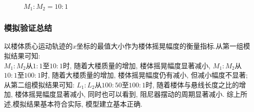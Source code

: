 \documentclass[10.5pt,a4paper]{ctexart}
\begin{document}
\begin{figure}[htbp] \centering    
      \\
  \caption{$M_1 : M_2 = 10 : 1$}     
  \label{fig:2}     
\end{figure}
\subsubsection*{模拟验证总结}
以楼体质心运动轨迹的$x$坐标的最值大小作为楼体摇晃幅度的衡量指标.从第一组模拟结果可知:\\
$M_1:M_2$从$1:1$至$10:1$时, 随着大楼质量的增加, 楼体摇晃幅度显著减小, 
$M_1:M_2$从$10:1$至$100:1$时, 随着大楼质量的增加, 楼体摇晃幅度仍有减小, 但减小幅度不显著; 从第二组模拟结果可知: $L_1:L_2$从$100:50$至$100:1$时, 
随着楼体与悬线长度之比的增加, 楼体摇晃幅度显著减小, 同时也可以看到, 阻尼器摆动的周期显著减小. 综上所述,模拟结果基本符合实际, 模型建立基本正确.
\newpage
\end{document}
